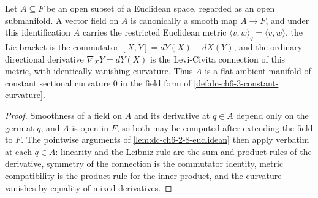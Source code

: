 \begin{lemma}
  \label{lem:dc-ch6-2-8-euclidean-opens}
  \leanok
  Let $A\subseteq F$ be an open subset of a Euclidean space, regarded as an
  open submanifold. A vector field on $A$ is canonically a smooth map
  $A\to F$, and under this identification $A$ carries the restricted Euclidean
  metric $\langle v,w\rangle_q=\langle v,w\rangle$, the Lie bracket is the
  commutator $[X,Y]=dY(X)-dX(Y)$, and the ordinary directional derivative
  $\nabla_XY=dY(X)$ is the Levi-Civita connection of this metric, with
  identically vanishing curvature. Thus $A$ is a flat ambient manifold of
  constant sectional curvature $0$ in the field form of
  \cref{def:dc-ch6-3-constant-curvature}.
\end{lemma}
\begin{proof}
  \leanok
  \sketch
  Smoothness of a field on $A$ and its derivative at $q\in A$ depend only on
  the germ at $q$, and $A$ is open in $F$, so both may be computed after
  extending the field to $F$. The pointwise arguments of
  \cref{lem:dc-ch6-2-8-euclidean} then apply verbatim at each $q\in A$:
  linearity and the Leibniz rule are the sum and product rules of the
  derivative, symmetry of the connection is the commutator identity, metric
  compatibility is the product rule for the inner product, and the curvature
  vanishes by equality of mixed derivatives.
\end{proof}

